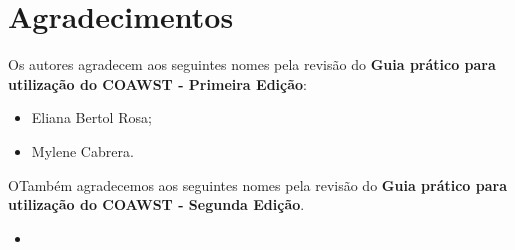 \chapter*{Agradecimentos}


\bigskip
\noindent Os autores agradecem aos seguintes nomes pela revisão do \textbf{Guia prático para utilização do COAWST - Primeira Edição}:
\bigskip

\begin{itemize}
    \item Eliana Bertol Rosa;
    \item Mylene Cabrera.
\end{itemize}

\bigskip
\noindent OTambém agradecemos aos seguintes nomes pela revisão do \textbf{Guia prático para utilização do COAWST - Segunda Edição}.
\bigskip

\begin{itemize}
    \item 
\end{itemize}
